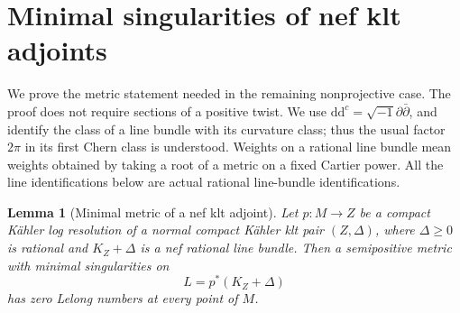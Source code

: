 \documentclass[11pt,letterpaper]{article}
\newtheorem{lemma}[theorem]{Lemma}
\theoremstyle{definition}
\theoremstyle{remark}
\begin{document}
\section{Minimal singularities of nef klt adjoints}
\label{met:section}

We prove the metric statement needed in the remaining nonprojective
case.  The proof does not require sections of a positive twist.  We use
\(\mathrm{d}\mathrm{d}^{c}=\sqrt{-1}\partial\bar\partial\), and identify the class of a line bundle
with its curvature class; thus the usual factor \(2\pi\) in its first
Chern class is understood.  Weights on a rational line bundle mean
weights obtained by taking a root of a metric on a fixed Cartier power.
All the line identifications below are actual rational line-bundle
identifications.

\begin{lemma}[Minimal metric of a nef klt adjoint]
\label{met:zero-lelong}
Let \(p\colon M\to Z\) be a compact K\"ahler log resolution of a normal
compact K\"ahler klt pair \((Z,\Delta)\), where \(\Delta\geq0\) is rational
and \(K_Z+\Delta\) is a nef rational line bundle.  Then a semipositive
metric with minimal singularities on
\[
 L=p^*(K_Z+\Delta)
\]
has zero Lelong numbers at every point of \(M\).
\end{lemma}
\end{document}
